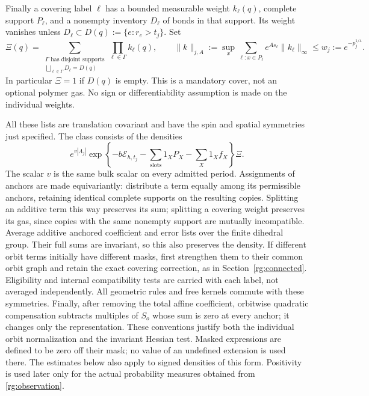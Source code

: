 Finally a covering label $\ell$ has a bounded measurable weight
$k_\ell(q)$, complete support $P_\ell$, and a nonempty inventory
$D_\ell$ of bonds in that support.  Its weight vanishes unless
$D_\ell\subset D(q):=\{e:r_e>t_j\}$.  Set
\begin{equation}
 \Xi(q)=\sum_{\substack{\Gamma\text{ has disjoint supports}\\
                  \bigsqcup_{\ell\in\Gamma}D_\ell=D(q)}}
                    \prod_{\ell\in\Gamma}k_\ell(q),
 \qquad
 \|k\|_{j,A}:=\sup_x\sum_{\ell:x\in P_\ell}
                  e^{As_\ell}\|k_\ell\|_\infty
       \le w_j:=e^{-p_j^{1/4}}.
 \label{rg:covering-gas}
\end{equation}
In particular $\Xi=1$ if $D(q)$ is empty.  This is a mandatory cover,
not an optional polymer gas.  No sign or differentiability assumption
is made on the individual weights.

All these lists are translation covariant and have the spin and
spatial symmetries just specified.  The class consists of the densities
\begin{equation}
 e^{v|\Lambda_j|}
 \exp\left\{-b\mathcal E_{h,t_j}
       -\sum_{\text{slots}}1_X P_X-\sum_X1_Xf_X\right\}\Xi.
 \label{rg:density}
\end{equation}
The scalar $v$ is the same bulk scalar on every admitted period.
Assignments of anchors are made equivariantly: distribute a term equally
among its permissible anchors, retaining identical complete supports
on the resulting copies.  Splitting an additive term this way preserves
its sum; splitting a covering weight preserves its gas, since copies
with the same nonempty support are mutually incompatible.  Average
additive anchored coefficient and error lists over the finite dihedral
group.  Their full sums are invariant, so this also preserves the density.
If different orbit terms initially have different masks, first strengthen
them to their common orbit graph and retain the exact covering correction,
as in Section~\ref{rg:connected}.  Eligibility and internal compatibility
tests are carried with each label, not averaged independently.  All
geometric rules and free kernels commute with these symmetries.
Finally, after removing the total affine coefficient, orbitwise quadratic
compensation subtracts multiples of $S_o$ whose sum is zero at every
anchor; it changes only the representation.  These conventions justify
both the individual orbit normalization and the invariant Hessian test.
Masked expressions are defined to be zero off their mask; no value
of an undefined extension is used there.  The estimates below also
apply to signed densities of this form.  Positivity is used later only
for the actual probability measures obtained from
\eqref{rg:observation}.

